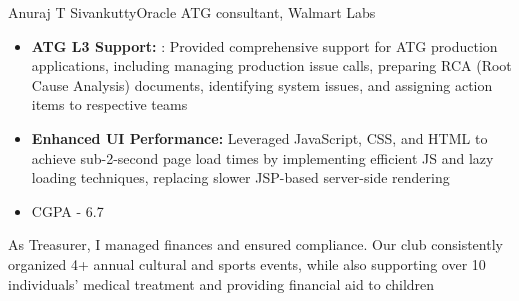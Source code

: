 \documentclass{article}
\begin{document}
\begin{cv}{Anuraj T Sivankutty}{Oracle ATG consultant, Walmart Labs}
\begin{cvevent}[Aug-2017][Sep-2018]
    \begin{itemize}

        \item \textbf{ATG L3 Support: }: Provided comprehensive support for ATG production applications, including managing production issue calls, preparing RCA (Root Cause Analysis) documents, identifying system issues, and assigning action items to respective teams
    
        \item  \textbf{Enhanced UI Performance:} Leveraged JavaScript, CSS, and HTML to achieve sub-2-second page load times by implementing efficient JS and lazy loading techniques, replacing slower JSP-based server-side rendering
        
    \end{itemize}
\end{cvevent}




\begin{cvevent}[Aug-2012][May-2016]
    \begin{itemize}
        \item CGPA - 6.7
    \end{itemize}
\end{cvevent}



\begin{cvevent}[July-2017][Present]
   As Treasurer, I managed finances and ensured compliance. Our club consistently organized 4+ annual cultural and sports events, while also supporting over 10 individuals' medical treatment and providing financial aid to children
\end{cvevent}

\cvseparator[2]



\cvsidebar %




\end{cv}
\end{document}

